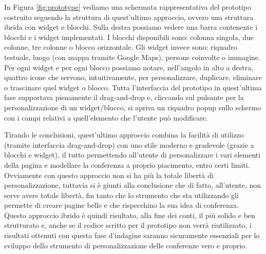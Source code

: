        	In Figura \ref{fig:prototype} vediamo una schermata rappresentativa del prototipo costruito seguendo la struttura di quest'ultimo approccio, ovvero una struttura ibrida con widget e blocchi. Sulla destra possiamo vedere una barra contenente i blocchi e i widget implementati. I blocchi disponibili sono: colonna singola, due colonne, tre colonne o blocco orizzontale. Gli widget invece sono: riquadro testuale, luogo (con mappa tramite Google Maps), persone coinvolte o immagine. Per ogni widget e per ogni blocco possiamo notare, nell'angolo in alto a destra, quattro icone che servono, intuitivamente, per personalizzare, duplicare, eliminare o trascinare quel widget o blocco. Tutta l'interfaccia del prototipo in quest'ultima fase supportava pienamente il drag-and-drop e, cliccando sul pulsante per la personalizzazione di un widget/blocco, si apriva un riquadro popup sullo schermo con i campi relativi a quell'elemento che l'utente può modificare.
       	
       	Tirando le conclusioni, quest'ultimo approccio combina la facilità di utilizzo (tramite interfaccia drag-and-drop) con uno stile moderno e gradevole (grazie a blocchi e widget), il tutto permettendo all'utente di personalizzare i vari elementi della pagina e modellare la conferenza a proprio piacimento, entro certi limiti. Ovviamente con questo approccio non si ha più la totale libertà di personalizzazione, tuttavia si è giunti alla conclusione che di fatto, all'utente, non serve avere totale libertà, fin tanto che lo strumento che sta utilizzando gli permette di creare pagine belle e che rispecchino la sua idea di conferenza. Questo approccio ibrido è quindi risultato, alla fine dei conti, il più solido e ben strutturato e, anche se il codice scritto per il prototipo non verrà riutilizzato, i risultati ottenuti con questa fase d'indagine saranno sicuramente essenziali per lo sviluppo dello strumento di personalizzazione delle conferenze vero e proprio.
